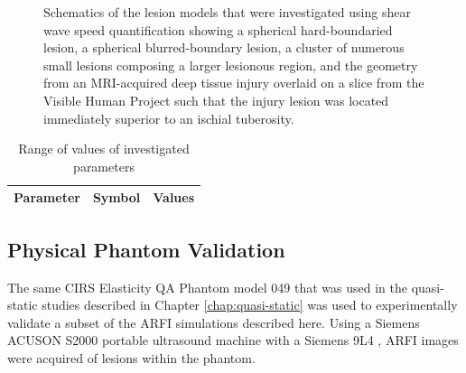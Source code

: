 \begin{figure}[!htb]
{
					\label{fig:shear_schematic_human}
				}
				\caption[Schematic of shear wave speed quantification-investigated lesions]{Schematics of the lesion models that were investigated using shear wave speed quantification showing \protect{} a spherical hard-boundaried lesion, \protect{} a spherical blurred-boundary lesion, \protect{} a cluster of numerous small lesions composing a larger lesionous region, and \protect{} the geometry from an MRI-acquired deep tissue injury overlaid on a slice from the Visible Human Project such that the injury lesion was located immediately superior to an ischial tuberosity.}	
				\label{fig:shear_schematics}
			\end{figure}

			\begin{table}[!htb]
				\centering
				\caption[ARFI model investigated parameters]{Range of values of investigated parameters}
				\label{tab:arfi-parametervalues}
				\begin{tabular}{lcc}
					\toprule
					Parameter & Symbol & Values \\
					\midrule
					\bottomrule
				\end{tabular}
			\end{table}

		\subsection{Physical Phantom Validation}
			The same CIRS Elasticity QA Phantom model 049 that was used in the quasi-static studies described in Chapter \ref{chap:quasi-static} was used to experimentally validate a subset of the ARFI simulations described here. Using a Siemens ACUSON S2000  portable ultrasound machine with a Siemens 9L4 , ARFI images were acquired of lesions within the phantom. 

